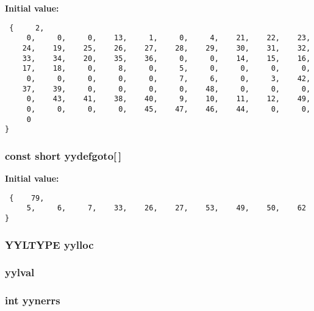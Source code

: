{\bf Initial value:}

\footnotesize\begin{verbatim} {     2,
     0,     0,     0,    13,     1,     0,     4,    21,    22,    23,
    24,    19,    25,    26,    27,    28,    29,    30,    31,    32,
    33,    34,    20,    35,    36,     0,     0,    14,    15,    16,
    17,    18,     0,     8,     0,     5,     0,     0,     0,     0,
     0,     0,     0,     0,     0,     7,     6,     0,     3,    42,
    37,    39,     0,     0,     0,     0,    48,     0,     0,     0,
     0,    43,    41,    38,    40,     9,    10,    11,    12,    49,
     0,     0,     0,     0,    45,    47,    46,    44,     0,     0,
     0
}\end{verbatim}\normalsize 
{}
\subsubsection{\setlength{\rightskip}{0pt plus 5cm}const short yydefgoto[$\,$]\hspace{0.3cm}{\tt  [static]}}\label{vcd__parser_8c_a91}


{\bf Initial value:}

\footnotesize\begin{verbatim} {    79,
     5,     6,     7,    33,    26,    27,    53,    49,    50,    62
}\end{verbatim}\normalsize 
{}
\subsubsection{\setlength{\rightskip}{0pt plus 5cm}YYLTYPE yylloc}\label{vcd__parser_8c_a98}


\subsubsection{ yylval}\label{vcd__parser_8c_a97}


\subsubsection{\setlength{\rightskip}{0pt plus 5cm}int yynerrs}\label{vcd__parser_8c_a99}


